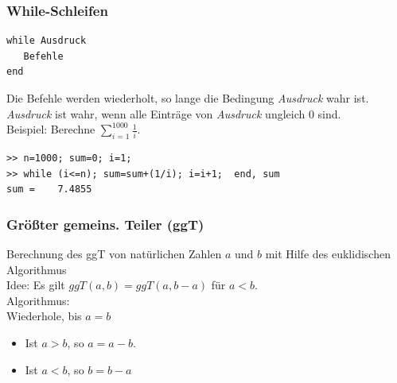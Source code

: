 %
%
%
\begin{frame}[fragile]\frametitle{While-Schleifen}
\begin{lstlisting}
while Ausdruck
   Befehle
end
\end{lstlisting}
Die Befehle werden wiederholt,  so lange die Bedingung {\it Ausdruck}
wahr ist.  {\it Ausdruck} ist wahr, wenn   alle Einträge von {\it
  Ausdruck} ungleich $0$ sind. \\[1cm] 

Beispiel: Berechne \alert{ $\sum_{i=1}^{1000} \frac{1}{i}$}.
\begin{lstlisting}
>> n=1000; sum=0; i=1; 
>> while (i<=n); sum=sum+(1/i); i=i+1;  end, sum
sum =    7.4855
\end{lstlisting}

\end{frame}
%
%
%
\begin{frame}[fragile]\frametitle{Größter gemeins. Teiler (ggT)}
Berechnung des ggT von natürlichen Zahlen $a$ und $b$ mit Hilfe des
euklidischen Algorithmus\\[1cm]

\alert{Idee:} Es gilt \alert{ $ggT(a,b)=ggT(a,b-a)$} für $a<b$.\\[1cm]

\alert{Algorithmus:} \\
Wiederhole,  bis $a=b$
\begin{itemize}
\item Ist $a>b$, so $a=a-b$.
\item Ist $a<b$, so $b=b-a$ 
\end{itemize}
\end{frame}

